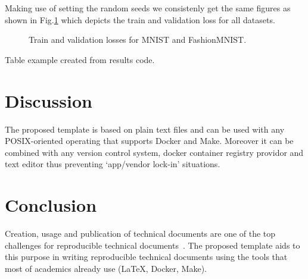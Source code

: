 \documentclass[journal]{IEEEtran}
\begin{document}
Making use of setting the random seeds we consistenly get the same figures as shown in Fig.\ref{fig:image} which depicts the train and validation loss for all datasets.
\begin{figure}[!t]
	\caption{Train and validation losses for MNIST and FashionMNIST.}
	\label{fig:image}
\end{figure}

\begin{table}[h]
	\centering
	\caption{Table example created from results code.}
	\label{table:table}
	\setlength\tabcolsep{2pt}
	
\end{table}

\section{Discussion}
The proposed template is based on plain text files and can be used with any POSIX-oriented operating that supports Docker and Make.
Moreover it can be combined with any version control system, docker container registry providor and text editor thus preventing `app/vendor lock-in' situations.

\section{Conclusion}
Creation, usage and publication of technical documents are one of the top challenges for reproducible technical documents~\cite{barba2019praxis}.
The proposed template aids to this purpose in writing reproducible technical documents using the tools that most of academics already use (\LaTeX, Docker, Make).



\end{document}

